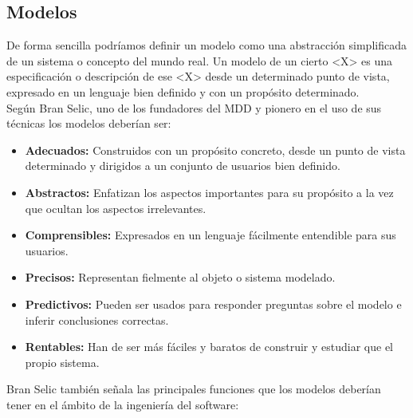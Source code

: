 \subsection{Modelos}
\label{Modelos}

De forma sencilla podríamos definir un modelo como una abstracción simplificada de un sistema o concepto del mundo real. Un modelo de un cierto <X>  es una especificación o descripción de ese <X> desde un determinado punto de vista, expresado en un lenguaje bien definido y con un propósito determinado.\\

Según Bran Selic, uno de los fundadores del MDD y pionero en el uso de sus técnicas los modelos deberían ser:
\begin{itemize}
	\item \textbf{Adecuados:} Construidos con un propósito concreto, desde un punto de vista determinado y dirigidos a un conjunto de usuarios bien definido.
	
	\item \textbf{Abstractos:} Enfatizan los aspectos importantes para su propósito a la vez que ocultan los aspectos irrelevantes.
	
	\item \textbf{Comprensibles:} Expresados en un lenguaje fácilmente entendible para sus usuarios.
	
	\item \textbf{Precisos:} Representan fielmente al objeto o sistema modelado.
	
	\item \textbf{Predictivos:} Pueden ser usados para responder preguntas sobre el modelo e inferir conclusiones correctas.
	
	\item \textbf{Rentables:} Han de ser más fáciles y baratos de construir y estudiar que el propio sistema.
\end{itemize}

Bran Selic también señala las principales funciones que los modelos deberían tener en el ámbito de la ingeniería del software:

